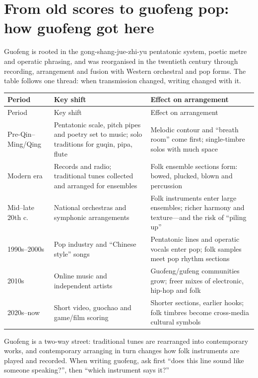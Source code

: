 \section{From old scores to guofeng pop: how guofeng got here}
\label{sec:guofeng-history}

Guofeng is rooted in the gong-shang-jue-zhi-yu pentatonic system, poetic metre and operatic phrasing, and was reorganised in the twentieth century through recording, arrangement and fusion with Western orchestral and pop forms. The table follows one thread: when transmission changed, writing changed with it.

\begin{longtable}{p{}p{}p{}}
\toprule
Period & Key shift & Effect on arrangement \\
\midrule
\endfirsthead
\toprule
Period & Key shift & Effect on arrangement \\
\midrule
\endhead
Pre-Qin--Ming/Qing & Pentatonic scale, pitch pipes and poetry set to music; solo traditions for guqin, pipa, flute & Melodic contour and ``breath room'' come first; single-timbre solos with much space \\
Modern era & Records and radio; traditional tunes collected and arranged for ensembles & Folk ensemble sections form: bowed, plucked, blown and percussion \\
Mid--late 20th c. & National orchestras and symphonic arrangements & Folk instruments enter large ensembles; richer harmony and texture---and the risk of ``piling up'' \\
1990s--2000s & Pop industry and ``Chinese style'' songs & Pentatonic lines and operatic vocals enter pop; folk samples meet pop rhythm sections \\
2010s & Online music and independent artists & Guofeng/gufeng communities grow; freer mixes of electronic, hip-hop and folk \\
2020s--now & Short video, guochao and game/film scoring & Shorter sections, earlier hooks; folk timbres become cross-media cultural symbols \\
\bottomrule
\end{longtable}

Guofeng is a two-way street: traditional tunes are rearranged into contemporary works, and contemporary arranging in turn changes how folk instruments are played and recorded. When writing guofeng, ask first ``does this line sound like someone speaking?'', then ``which instrument says it?''

